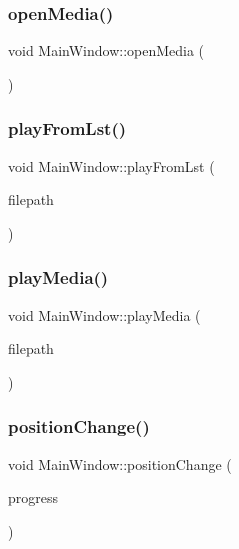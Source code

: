 \mbox{\label{class_main_window_a4d1d22c142d53f07ddff0f09e734ec05}} 
\subsubsection{\texorpdfstring{openMedia()}{openMedia()}}
{\footnotesize\ttfamily void Main\+Window\+::open\+Media (\begin{DoxyParamCaption}{ }\end{DoxyParamCaption})}

\mbox{\label{class_main_window_a7c87bfef3bf68130cd604ead9e98f3bd}} 
\subsubsection{\texorpdfstring{playFromLst()}{playFromLst()}}
{\footnotesize\ttfamily void Main\+Window\+::play\+From\+Lst (\begin{DoxyParamCaption}\item[{Q\+String}]{filepath }\end{DoxyParamCaption})}

\mbox{\label{class_main_window_aa8f59dc598f84267dda1cc7e0120560e}} 
\subsubsection{\texorpdfstring{playMedia()}{playMedia()}}
{\footnotesize\ttfamily void Main\+Window\+::play\+Media (\begin{DoxyParamCaption}\item[{Q\+String}]{filepath }\end{DoxyParamCaption})}

\mbox{\label{class_main_window_a1859a3e6fa98e564751865ce24526020}} 
\subsubsection{\texorpdfstring{positionChange()}{positionChange()}}
{\footnotesize\ttfamily void Main\+Window\+::position\+Change (\begin{DoxyParamCaption}\item[{qint64}]{progress }\end{DoxyParamCaption})}



